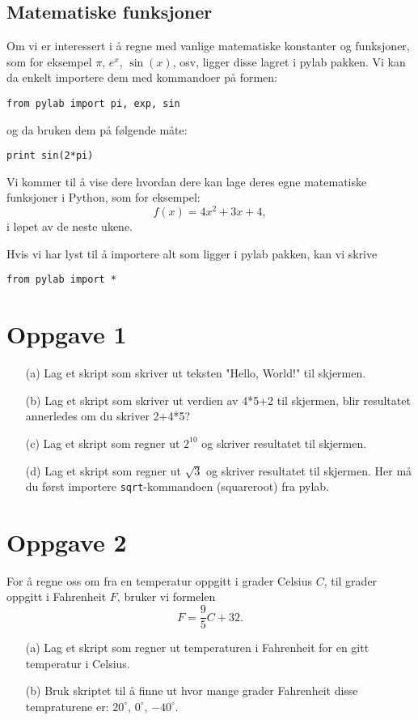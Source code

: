 \documentclass[a4paper, 11pt, notitlepage, english]{article}
\begin{document}
\subsection*{Matematiske funksjoner}
Om vi er interessert i å regne med vanlige matematiske konstanter og funksjoner, som for eksempel $\pi$, $e^x$, $\sin(x)$, osv, ligger disse lagret i pylab pakken. Vi kan da enkelt importere dem med kommandoer på formen:
\begin{lstlisting}
from pylab import pi, exp, sin
\end{lstlisting}
\vspace{-0.3cm}
og da bruken dem på følgende måte:
\begin{lstlisting}
print sin(2*pi)
\end{lstlisting}
\vspace{-0.3cm}

Vi kommer til å vise dere hvordan dere kan lage deres egne matematiske funksjoner i Python, som for eksempel:
$$f(x) = 4x^2 + 3x + 4,$$
i løpet av de neste ukene.

Hvis vi har lyst til å importere alt som ligger i pylab pakken, kan vi skrive
\begin{lstlisting}
from pylab import *
\end{lstlisting}


\clearpage

\section*{Oppgave 1}
\begin{itemize}
    \item[(a)] Lag et skript som skriver ut teksten "Hello, World!" til skjermen.
    \item[(b)] Lag et skript som skriver ut verdien av 4*5+2 til skjermen, blir resultatet annerledes om du skriver 2+4*5?
    \item[(c)] Lag et skript som regner ut $2^{10}$ og skriver resultatet til skjermen.
    \item[(d)] Lag et skript som regner ut $\sqrt{3}$ og skriver resultatet til skjermen. Her må du først importere \verb+sqrt+-kommandoen (squareroot) fra pylab.
\end{itemize}

\section*{Oppgave 2}
For å regne oss om fra en temperatur oppgitt i grader Celsius $C$, til grader oppgitt i Fahrenheit $F$, bruker vi formelen
$$F = \frac{9}{5}C + 32.$$
\begin{itemize}
    \item[(a)] Lag et skript som regner ut temperaturen i Fahrenheit for en gitt temperatur i Celsius.
    \item[(b)] Bruk skriptet til å finne ut hvor mange grader Fahrenheit disse tempraturene er: $20^\circ$, $0^\circ$, $-40^\circ$.
\end{itemize}
\end{document}
